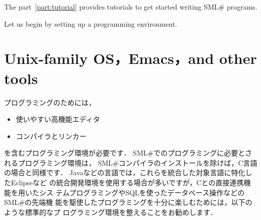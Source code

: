 \documentclass{jbook}
\newif\ifjp
\newcommand{\txt}[2]{#2}
\newcommand{\smlsharp}{SML\#}
\begin{document}
\ifjp%
	第２部では，\smlsharp{}でプログラミングをマスターするための
チュートリアルを提供します．
	まず\smlsharp{}プログラミング環境を整えましょう．
\else%
	The part~\ref{part:tutorial} provides tutorials to get started
writing \smlsharp{} programs.

	Let us begin by setting up a programming environment.
\fi%

\section{
\txt{Unix系OS，Emacsエディタ，その他ツールの整備}
    {Unix-family OS，Emacs，and other tools}}
\label{sec:tutorialEnvironmemt}

\ifjp%
	プログラミングのためには，
\begin{itemize}
\item 使いやすい高機能エディタ
\item コンパイラとリンカー
\end{itemize}
を含むプログラミング環境が必要です．
	\smlsharp{}でのプログラミングに必要とされるプログラミング環境は，
\smlsharp{}コンパイラのインストールを除けば，C言語の場合と同様です．
	Javaなどの言語では，これらを統合した対象言語に特化したEclipseなど
の統合開発環境を使用する場合が多いですが，Cとの直接連携機能を用いたシス
テムプログラミングやSQLを使ったデータベース操作などの\smlsharp{}の先端機
能を駆使したプログラミングを十分に楽しむためには，以下のような標準的なプ
ログラミング環境を整えることをお勧めします．
\end{document}
